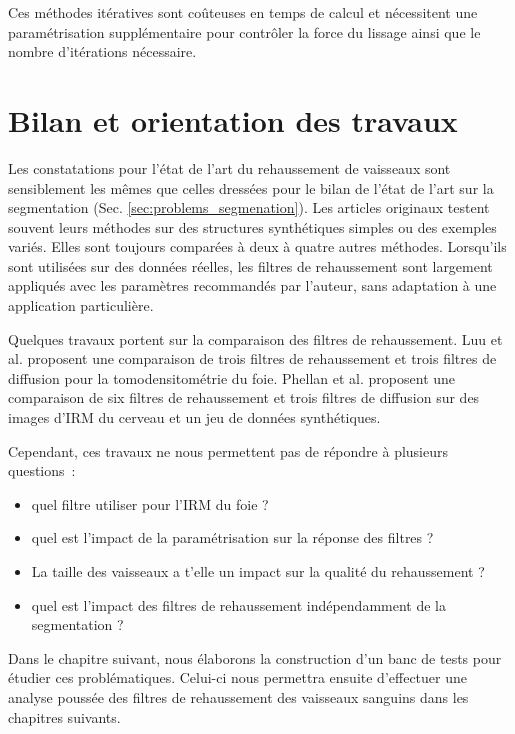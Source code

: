 Ces méthodes itératives sont coûteuses en temps de calcul et nécessitent une paramétrisation supplémentaire pour contrôler la force du lissage ainsi que le nombre d'itérations nécessaire.

\section{Bilan et orientation des travaux}
\label{sec:EA:bilan}

Les constatations pour l'état de l'art du rehaussement de vaisseaux sont sensiblement les mêmes que celles dressées pour le bilan de l'état de l'art sur la segmentation (Sec. \ref{sec:problems_segmenation}). Les articles originaux testent souvent leurs méthodes sur des structures synthétiques simples ou des exemples variés. Elles sont toujours comparées à deux à quatre autres méthodes. Lorsqu'ils sont utilisées sur des données réelles, les filtres de rehaussement sont largement appliqués avec les paramètres recommandés par l'auteur, sans adaptation à une application particulière.

Quelques travaux portent sur la comparaison des filtres de rehaussement. Luu et al. \cite{Luu2015_liver_vesselness_comparison} proposent une comparaison de trois filtres de rehaussement et trois filtres de diffusion pour la tomodensitométrie du foie. Phellan et al. \cite{Phellan2017_Brain_vesselness_comparison} proposent une comparaison de six filtres de rehaussement et trois filtres de diffusion sur des images d'IRM du cerveau et un jeu de données synthétiques.

Cependant, ces travaux ne nous permettent pas de répondre à plusieurs questions~:

\begin{itemize}
\item quel filtre utiliser pour l'IRM du foie ?
\item quel est l'impact de la paramétrisation sur la réponse des filtres ?
\item La taille des vaisseaux a t'elle un impact sur la qualité du rehaussement ?
\item quel est l'impact des filtres de rehaussement indépendamment de la segmentation ?
\end{itemize}

Dans le chapitre suivant, nous élaborons la construction d'un banc de tests pour étudier ces problématiques. Celui-ci nous permettra ensuite d'effectuer une analyse poussée des filtres de rehaussement des vaisseaux sanguins dans les chapitres suivants.








